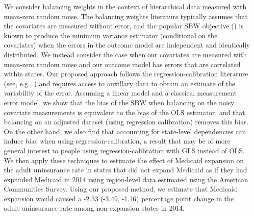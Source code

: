 \documentclass[aoas]{imsart}
\theoremstyle{plain}
\theoremstyle{remark}
\begin{document}
\begin{frontmatter}
\begin{flushleft}
We consider balancing weights in the context of hierarchical data measured with mean-zero random noise. The balancing weights literature typically assumes that the covariates are measured without error, and the popular SBW objective (\cite{zubizarreta2015stable}) is known to produce the minimum variance estimator (conditional on the covariates) when the errors in the outcome model are independent and identically distributed. We instead consider the case when our covariates are measured with mean-zero random noise and our outcome model has errors that are correlated within states. Our proposed approach follows the regression-calibration literature (see, e.g., \cite{gleser1992importance}) and requires access to auxillary data to obtain an estimate of the variability of the error. Assuming a linear model and a classical measurement error model, we show that the bias of the SBW when balancing on the noisy covariate measurements is equivalent to the bias of the OLS estimator, and that balancing on an adjusted dataset (using regression calibration) removes this bias. On the other hand, we also find that accounting for state-level dependencies can induce bias when using regression-calibration, a result that may be of more general interest to people using regression-calibration with GLS instead of OLS. We then apply these techniques to estimate the effect of Medicaid expansion on the adult uninsurance rate in states that did not expand Medicaid as if they had expanded Medicaid in 2014 using region-level data estimated using the American Communities Survey. Using our proposed method, we estimate that Medicaid expansion would caused a -2.33 (-3.49, -1.16) percentage point change in the adult uninsurance rate among non-expansion states in 2014. 
\end{flushleft}


\begin{keyword}
\end{keyword}

\end{frontmatter}

\end{document}
